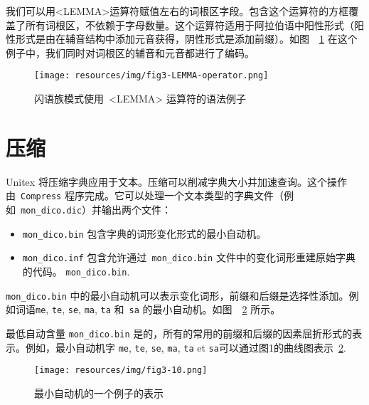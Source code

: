 \bigskip
\noindent 
我们可以用<LEMMA>运算符赋值左右的词根区字段。包含这个运算符的方框覆盖了所有词根区，不依赖于字母数量。这个运算符适用于阿拉伯语中阳性形式（阳性形式是由在辅音结构中添加元音获得，阴性形式是添加前缀）。如图\ ~\ref{LEMMA-operator} 在这个例子中，我们同时对词根区的辅音和元音都进行了编码。


\begin{figure}[!ht]
\begin{center}
\texttt{[image: resources/img/fig3-LEMMA-operator.png]}
\caption{闪语族模式使用\ <LEMMA>\label{LEMMA-operator} 运算符的语法例子}
\end{center}
\end{figure}

\section{压缩}

Unitex 将压缩字典应用于文本。压缩可以削减字典大小并加速查询。这个操作由\ \verb+Compress+ 程序完成。它可以处理一个文本类型的字典文件（例如\ \verb+mon_dico.dic+）并输出两个文件：


\begin{itemize}
  \item \verb+mon_dico.bin+ 包含字典的词形变化形式的最小自动机。
  \item \verb+mon_dico.inf+ 包含允许通过\ \verb+mon_dico.bin+ 文件中的变化词形重建原始字典的代码。 \verb+mon_dico.bin+.
\end{itemize}

\noindent
\verb+mon_dico.bin+ 中的最小自动机可以表示变化词形，前缀和后缀是选择性添加。例如词语\verb+me+, \verb+te+, \verb+se+,
\verb+ma+, \verb+ta+ 和\ \verb+sa+ 的最小自动机。如图\ ~\ref{fig-example-minimal-automaton} 所示。




最低自动含量 \verb+mon_dico.bin+ 是的，所有的常用的前缀和后缀的因素屈折形式的表示。例如，最小自动机字 \verb+me+, \verb+te+, \verb+se+,
\verb+ma+, \verb+ta+ et \verb+sa+可以通过图1的曲线图表示~\ref{fig-example-minimal-automaton}.
\bigskip \begin{figure}[!h]
\begin{center}
\texttt{[image: resources/img/fig3-10.png]}
\caption{最小自动机的一个例子的表示\label{fig-example-minimal-automaton}}
\end{center}
\end{figure}

